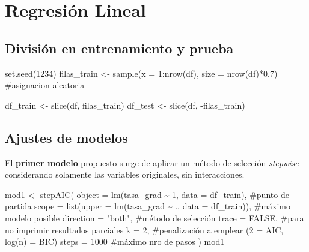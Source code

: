 \documentclass[
  letterpaper,
  DIV=11,
  numbers=noendperiod]{scrartcl}
\newenvironment{Shaded}{\begin{snugshade}}{\end{snugshade}}
\newcommand{\AttributeTok}[1]{\textcolor[rgb]{0.40,0.45,0.13}{#1}}
\newcommand{\CommentTok}[1]{\textcolor[rgb]{0.37,0.37,0.37}{#1}}
\newcommand{\ConstantTok}[1]{\textcolor[rgb]{0.56,0.35,0.01}{#1}}
\newcommand{\DecValTok}[1]{\textcolor[rgb]{0.68,0.00,0.00}{#1}}
\newcommand{\FloatTok}[1]{\textcolor[rgb]{0.68,0.00,0.00}{#1}}
\newcommand{\FunctionTok}[1]{\textcolor[rgb]{0.28,0.35,0.67}{#1}}
\newcommand{\NormalTok}[1]{\textcolor[rgb]{0.00,0.23,0.31}{#1}}
\newcommand{\OtherTok}[1]{\textcolor[rgb]{0.00,0.23,0.31}{#1}}
\newcommand{\SpecialCharTok}[1]{\textcolor[rgb]{0.37,0.37,0.37}{#1}}
\newcommand{\StringTok}[1]{\textcolor[rgb]{0.13,0.47,0.30}{#1}}
\begin{document}
\hypertarget{regresiuxf3n-lineal}{%
\section{Regresión Lineal}\label{regresiuxf3n-lineal}}

\hypertarget{divisiuxf3n-en-entrenamiento-y-prueba}{%
\subsection{División en entrenamiento y
prueba}\label{divisiuxf3n-en-entrenamiento-y-prueba}}

\begin{Shaded}
\begin{Highlighting}[]
\FunctionTok{set.seed}\NormalTok{(}\DecValTok{1234}\NormalTok{)}
\NormalTok{filas\_train }\OtherTok{\textless{}{-}} \FunctionTok{sample}\NormalTok{(}\AttributeTok{x =} \DecValTok{1}\SpecialCharTok{:}\FunctionTok{nrow}\NormalTok{(df), }\AttributeTok{size =} \FunctionTok{nrow}\NormalTok{(df)}\SpecialCharTok{*}\FloatTok{0.7}\NormalTok{) }\CommentTok{\#asignacion aleatoria}

\NormalTok{df\_train }\OtherTok{\textless{}{-}} \FunctionTok{slice}\NormalTok{(df, filas\_train)}
\NormalTok{df\_test }\OtherTok{\textless{}{-}} \FunctionTok{slice}\NormalTok{(df, }\SpecialCharTok{{-}}\NormalTok{filas\_train)}
\end{Highlighting}
\end{Shaded}

\hypertarget{ajustes-de-modelos}{%
\subsection{Ajustes de modelos}\label{ajustes-de-modelos}}

El \textbf{primer modelo} propuesto surge de aplicar un método de
selección \emph{stepwise} considerando solamente las variables
originales, sin interacciones.

\begin{Shaded}
\begin{Highlighting}[]
\NormalTok{mod1 }\OtherTok{\textless{}{-}} \FunctionTok{stepAIC}\NormalTok{(}
  \AttributeTok{object =} \FunctionTok{lm}\NormalTok{(tasa\_grad }\SpecialCharTok{\textasciitilde{}} \DecValTok{1}\NormalTok{, }\AttributeTok{data =}\NormalTok{ df\_train), }\CommentTok{\#punto de partida}
  \AttributeTok{scope =} \FunctionTok{list}\NormalTok{(}\AttributeTok{upper =} \FunctionTok{lm}\NormalTok{(tasa\_grad }\SpecialCharTok{\textasciitilde{}}\NormalTok{ ., }\AttributeTok{data =}\NormalTok{ df\_train)), }\CommentTok{\#máximo modelo posible}
  \AttributeTok{direction =} \StringTok{"both"}\NormalTok{, }\CommentTok{\#método de selección}
  \AttributeTok{trace =} \ConstantTok{FALSE}\NormalTok{, }\CommentTok{\#para no imprimir resultados parciales}
  \AttributeTok{k =} \DecValTok{2}\NormalTok{, }\CommentTok{\#penalización a emplear (2 = AIC, log(n) = BIC)}
  \AttributeTok{steps =} \DecValTok{1000} \CommentTok{\#máximo nro de pasos}
\NormalTok{)}
\NormalTok{mod1}
\end{Highlighting}
\end{Shaded}
\end{document}
